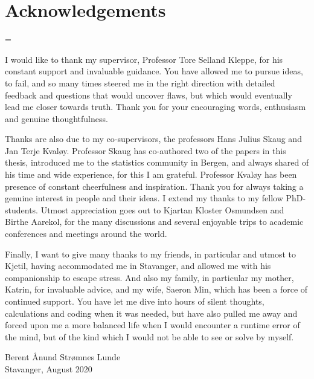 \chapter*{Acknowledgements}

\emergencystretch=\maxdimen
{}

I would like to thank my supervisor, Professor Tore Selland Kleppe, for his constant support and invaluable guidance. You have allowed me to 
pursue ideas, to fail, and so many times steered me in the right direction with detailed feedback and questions that would uncover flaws, but which would eventually lead me closer towards truth.
Thank you for your encouraging words, enthusiasm and genuine thoughtfulness.

Thanks are also due to my co-supervisors, the professors Hans Julius Skaug and Jan Terje Kvaløy.
Professor Skaug has co-authored two of the papers in this thesis, introduced me to the statistics community in Bergen, and always shared of his time and wide experience, for this I am grateful.
Professor Kvaløy has been presence of constant cheerfulness and inspiration. Thank you for always taking a genuine interest in people and their ideas.
I extend my thanks to my fellow PhD-students. Utmost appreciation goes out to Kjartan Kloster Osmundsen and Birthe Aarekol, for the many discussions and several enjoyable trips to academic conferences and meetings around the world.


Finally, I want to give many thanks to my friends, in particular and utmost to Kjetil, having accommodated me in Stavanger, and allowed me with his companionship to escape stress. And also my family, in particular my mother, Katrin, for invaluable advice, and my wife, Saeron Min, which has been a force of continued support. 
You have let me dive into hours of silent thoughts, calculations and coding when it was needed, but have also pulled me away and forced upon me a more balanced life when I would encounter a runtime error of the mind, but of the kind which I would not be able to see or solve by myself.
\vspace{60pt}

Berent Ånund Strømnes Lunde\\
Stavanger, August 2020
